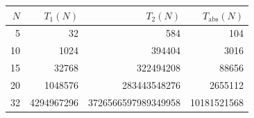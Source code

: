 \begin{center}\small
\begin{tabular}{r|r|r|r}
$N$ & $T_1(N)$ & $T_2(N)$ & $T_{\mathrm{abs}}(N)$\\\hline
5 & 32 & 584 & 104\\
10 & 1024 & 394404 & 3016\\
15 & 32768 & 322494208 & 88656\\
20 & 1048576 & 283443548276 & 2655112\\
32 & 4294967296 & 3726566597989349958 & 10181521568\\
\end{tabular}
\end{center}
